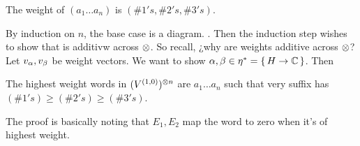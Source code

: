 \documentclass[12pt]{memoir}
\begin{document}
\begin{Lem}
    The weight of $(a_1\dots a_n)$ is $(\# 1's,\# 2's,\# 3's)$.
\end{Lem}

\begin{ptcbp}
By induction on $n$, the base case is a diagram. . Then the induction step wishes to show that  is additivw across $\otimes$. So recall, ¿why are weights additive across $\otimes$? Let $v_\alpha,v_\beta$ be weight vectors. We want to show $\alpha,\beta\in\eta^\ast=\{\,H\to\mathbb{C}\,\}$. Then 
\end{ptcbp}

\begin{Cor}
The highest weight words in $(V^{(1,0)})^{\otimes n}$ are $a_1\dots a_n$ such that very suffix  has $(\#1's)\geq(\#2's)\geq(\#3's)$.
\end{Cor}

The proof is basically noting that $E_1,E_2$ map the word to zero when it's of highest weight.
\end{document}
